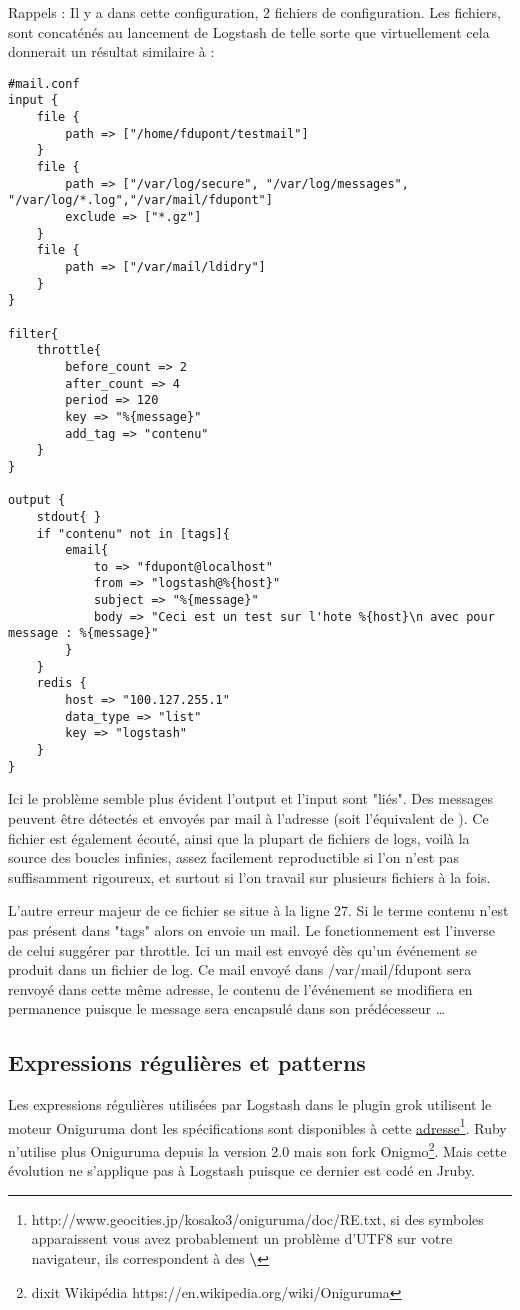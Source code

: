 Rappels : Il y a dans cette configuration, 2 fichiers de configuration. Les fichiers,
sont concaténés au lancement de Logstash de telle sorte que virtuellement cela donnerait 
un résultat similaire à :


\begin{lstlisting}[style=logstash,label={lst:conflogstashiniteloop2},caption={Infinite loop concaténé}]
#mail.conf
input {
    file {
        path => ["/home/fdupont/testmail"]
    }
    file {
        path => ["/var/log/secure", "/var/log/messages", "/var/log/*.log","/var/mail/fdupont"]
        exclude => ["*.gz"]
    }
    file {
        path => ["/var/mail/ldidry"]
    }
}

filter{
    throttle{
        before_count => 2
        after_count => 4
        period => 120
        key => "%{message}"
        add_tag => "contenu"
    }
}

output {
    stdout{ }
    if "contenu" not in [tags]{
        email{
            to => "fdupont@localhost"
            from => "logstash@%{host}"
            subject => "%{message}"
            body => "Ceci est un test sur l'hote %{host}\n avec pour message : %{message}"
        }
    }
    redis {
        host => "100.127.255.1"
        data_type => "list"
        key => "logstash"
    }
}
\end{lstlisting}

Ici le problème semble plus évident l'output et l'input sont "liés". Des messages
peuvent être détectés et envoyés par mail à l'adresse  (soit
l'équivalent de ). Ce fichier est également écouté, ainsi que la 
plupart de fichiers de logs, voilà la source des boucles infinies, assez facilement
reproductible si l'on n'est pas suffisamment rigoureux, et surtout si l'on travail 
sur plusieurs fichiers à la fois.

L'autre erreur majeur de ce fichier se situe à la ligne 27. Si le terme contenu 
n'est pas présent dans "tags" alors on envoie un mail. Le fonctionnement est l'inverse 
de celui suggérer par throttle. Ici un mail est envoyé dès qu'un événement se produit
dans un fichier de log. Ce mail envoyé dans /var/mail/fdupont sera renvoyé dans cette
même adresse, le contenu de l'événement se modifiera en permanence puisque le message
sera encapsulé dans son prédécesseur \ldots

\subsection{Expressions régulières et patterns}
Les expressions régulières utilisées par Logstash dans le plugin grok utilisent le 
moteur Oniguruma dont les spécifications sont disponibles à cette 
\href{http://www.geocities.jp/kosako3/oniguruma/doc/RE.txt}{adresse}\footnote{http://www.geocities.jp/kosako3/oniguruma/doc/RE.txt, 
si des symboles \textbf{ \textyen} apparaissent vous avez probablement un problème d'UTF8 sur 
votre navigateur, ils correspondent à des \textbf{ \textbackslash}}.
Ruby n'utilise plus Oniguruma depuis la version 2.0 mais son fork Onigmo\footnote{
dixit Wikipédia https://en.wikipedia.org/wiki/Oniguruma}. Mais cette évolution ne
s'applique pas à Logstash puisque ce dernier est codé en Jruby.

